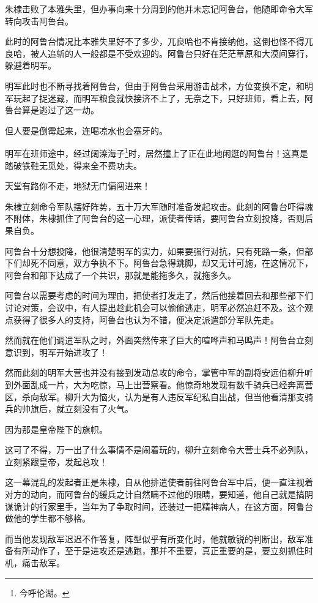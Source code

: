 \begin{multicols}{\theparacolNo}
朱棣击败了本雅失里，但办事向来十分周到的他并未忘记阿鲁台，他随即命令大军转向攻击阿鲁台。

此时的阿鲁台情况比本雅失里好不了多少，兀良哈也不肯接纳他，这倒也怪不得兀良哈，被人追斩的人一般都是不受欢迎的。阿鲁台只好在茫茫草原和大漠间穿行，躲避着明军。

明军此时也不断寻找着阿鲁台，但由于阿鲁台采用游击战术，方位变换不定，和明军玩起了捉迷藏，而明军粮食就快接济不上了，无奈之下，只好班师，看上去，阿鲁台算是逃过了这一劫。

但人要是倒霉起来，连喝凉水也会塞牙的。

明军在班师途中，经过阔滦海子\footnote{今呼伦湖。}时，居然撞上了正在此地闲逛的阿鲁台！这真是踏破铁鞋无觅处，得来全不费功夫。

天堂有路你不走，地狱无门偏闯进来！

朱棣立刻命令军队摆好阵势，五十万大军随时准备发起攻击。此刻的阿鲁台吓得魂不附体，朱棣抓住了阿鲁台的这一心理，派使者传话，要阿鲁台立刻投降，否则后果自负。

阿鲁台十分想投降，他很清楚明军的实力，如果要强行对抗，只有死路一条，但部下们却死不同意，双方争执不下。阿鲁台急得跳脚，却又无计可施，在这情况下，阿鲁台和部下达成了一个共识，那就是能拖多久，就拖多久。

阿鲁台以需要考虑的时间为理由，把使者打发走了，然后他接着回去和那些部下们讨论对策，会议中，有人提出趁此机会可以偷偷逃走，明军必然追赶不及。这个观点获得了很多人的支持，阿鲁台也认为不错，便决定派遣部分军队先走。

然而就在他们调遣军队之时，外面突然传来了巨大的喧哗声和马鸣声！阿鲁台立刻意识到，明军开始进攻了！

然而此刻的明军大营也并没有接到发动总攻的命令，掌管中军的副将安远伯柳升听到外面乱成一片，大为吃惊，马上出营察看。他惊奇地发现有数千骑兵已经奔离营区，杀向敌军。柳升大为恼火，认为是有人违反军纪私自出战，但当他看清那支骑兵的帅旗后，就立刻没有了火气。

因为那是皇帝陛下的旗帜。

这可了不得，万一出了什么事情不是闹着玩的，柳升立刻命令大营士兵不必列队，立刻紧跟皇帝，发起总攻！

这一幕混乱的发起者正是朱棣，自从他排遣使者前往阿鲁台军中后，便一直注视着对方的动向，而阿鲁台的缓兵之计自然瞒不过他的眼睛，要知道，他自己就是搞阴谋诡计的行家里手，当年为了争取时间，还装过一把精神病人，在这方面，阿鲁台做他的学生都不够格。

而当他发现敌军迟迟不作答复，阵型似乎有所变化时，他就敏锐的判断出，敌军准备有所动作了，至于是进攻还是逃跑，那并不重要，真正重要的是，要立刻抓住时机，痛击敌军。


\end{multicols}
